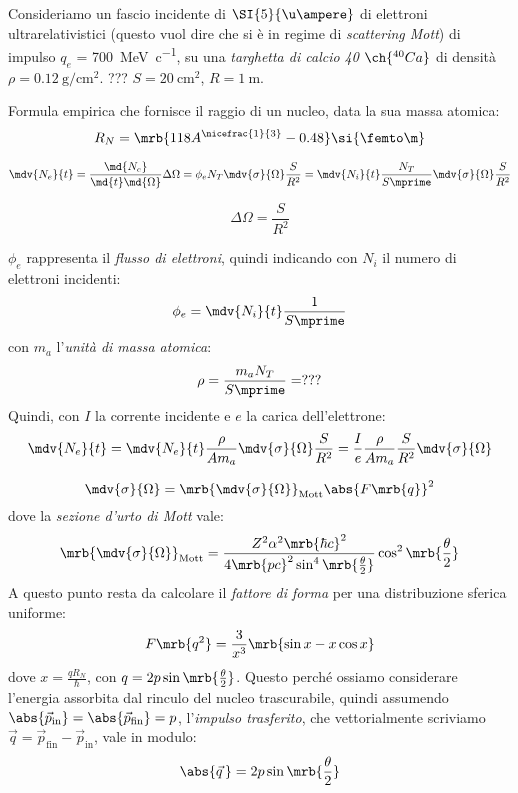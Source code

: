 \begin{example}
  Consideriamo un fascio incidente di $\SI{5}{\u\ampere}$ di elettroni
  ultrarelativistici (questo vuol dire che si è in regime di \textit{scattering
  Mott}) di impulso $q_e$ = \SI{700}{\MeV\per c}, su una \textit{targhetta di
  calcio 40} $\ch{^{40}Ca}$ di densità $\rho = \SI{0.12}{\g \per \cm^2}$.
  ??? $S = \SI{20}{\cm^2}$, $R = \SI{1}{\m}$.


  Formula empirica che fornisce il raggio di un nucleo, data la sua massa
  atomica:
  \[
    R_N = \mrb{118 A ^{\nicefrac{1}{3}} - 0.48} \si{\femto\m}
  \]

  \[
    \mdv{N_e}{t} = \frac{\md{N_e}}{\md{t} \md{\Omega}} \Delta \Omega = \phi_e
    N_T \mdv{\sigma}{\Omega} \frac{S}{R^2} = \mdv{N_i}{t} \frac{N_T}{S \mprime}
    \mdv{\sigma}{\Omega} \frac{S}{R^2}
  \]
  
  \[
    \Delta \Omega = \frac{S}{R^2}
  \]

  $\phi_e$ rappresenta il \textit{flusso di elettroni}, quindi indicando con
  $N_i$ il numero di elettroni incidenti:
  \[
    \phi _{e} = \mdv{N_i}{t} \frac{1}{S \mprime}
  \]
  con $m_a$ l'\textit{unità di massa atomica}:
  \[
    \rho = \frac{m _a N_T}{S \mprime} = ??? %
  \]
  Quindi, con $I$ la corrente incidente e $e$ la carica dell'elettrone:
  \[
    \mdv{N_e}{t} = \mdv{N_e}{t} \frac{\rho}{A m_a} \mdv{\sigma}{\Omega}
    \frac{S}{R^2} = \frac{I}{e} \frac{\rho}{A m_a} \frac{S}{R^2}
    \mdv{\sigma}{\Omega}
  \]

  \[
    \mdv{\sigma}{\Omega} = \mrb{\mdv{\sigma}{\Omega}}_\text{Mott} \abs{F
    \mrb{q}}^{2}
  \]
  dove la \textit{sezione d'urto di Mott} vale:
  \[
    \mrb{\mdv{\sigma}{\Omega}}_\text{Mott} = \frac{Z^2 \alpha^2 \mrb{\hbar
    c}^{2}}{4 \mrb{pc}^{2} \sin^4 \mrb{\frac{\theta}{2}}} \cos ^{2}
    \mrb{\frac{\theta}{2}}
  \]
  A questo punto resta da calcolare il \textit{fattore di forma} per una
  distribuzione sferica uniforme:
  \[
    F \mrb{q^2} = \frac{3}{x^3} \mrb{\sin x - x \cos x} %
  \]
  dove $x = \frac{q R_N}{\hbar}$, con $q = 2 p \sin \mrb{\frac{\theta}{2}}$.
  Questo perché ossiamo considerare l'energia assorbita dal rinculo del nucleo
  trascurabile, quindi assumendo $\abs{\vec{p}_\text{in}} =
  \abs{\vec{p}_\text{fin}} = p$, l'\textit{impulso trasferito}, che
  vettorialmente scriviamo $\vec{q} = \vec{p}_\text{fin} - \vec{p}_\text{in}$,
  vale in modulo:
  \[
    \abs{\vec{q}\,} = 2 p \sin \mrb{\frac{\theta}{2}}
  \]
\end{example}
